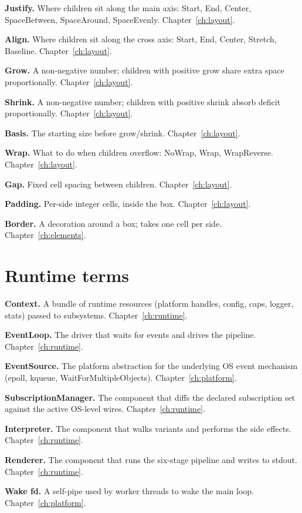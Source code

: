 \textbf{Justify.} Where children sit along the main axis:
Start, End, Center, SpaceBetween, SpaceAround, SpaceEvenly.
Chapter~\ref{ch:layout}.

\textbf{Align.} Where children sit along the cross axis:
Start, End, Center, Stretch, Baseline. Chapter~\ref{ch:layout}.

\textbf{Grow.} A non-negative number; children with positive
grow share extra space proportionally. Chapter~\ref{ch:layout}.

\textbf{Shrink.} A non-negative number; children with positive
shrink absorb deficit proportionally. Chapter~\ref{ch:layout}.

\textbf{Basis.} The starting size before grow/shrink.
Chapter~\ref{ch:layout}.

\textbf{Wrap.} What to do when children overflow: NoWrap, Wrap,
WrapReverse. Chapter~\ref{ch:layout}.

\textbf{Gap.} Fixed cell spacing between children.
Chapter~\ref{ch:layout}.

\textbf{Padding.} Per-side integer cells, inside the box.
Chapter~\ref{ch:layout}.

\textbf{Border.} A decoration around a box; takes one cell per
side. Chapter~\ref{ch:elements}.

\section{Runtime terms}

\textbf{Context.} A bundle of runtime resources (platform
handles, config, caps, logger, stats) passed to subsystems.
Chapter~\ref{ch:runtime}.

\textbf{EventLoop.} The driver that waits for events and drives
the pipeline. Chapter~\ref{ch:runtime}.

\textbf{EventSource.} The platform abstraction for the
underlying OS event mechanism (epoll, kqueue,
WaitForMultipleObjects). Chapter~\ref{ch:platform}.

\textbf{SubscriptionManager.} The component that diffs the
declared subscription set against the active OS-level wires.
Chapter~\ref{ch:runtime}.

\textbf{Interpreter.} The component that walks
 variants and performs the side effects.
Chapter~\ref{ch:runtime}.

\textbf{Renderer.} The component that runs the six-stage
pipeline and writes to stdout. Chapter~\ref{ch:runtime}.

\textbf{Wake fd.} A self-pipe used by worker threads to wake
the main loop. Chapter~\ref{ch:platform}.

